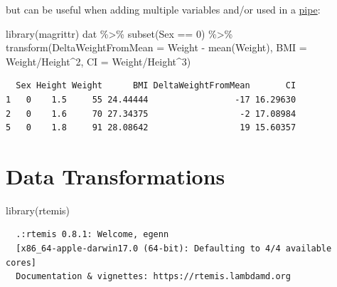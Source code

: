 \documentclass[
]{book}
\newenvironment{Shaded}{\begin{snugshade}}{\end{snugshade}}
\newcommand{\AttributeTok}[1]{\textcolor[rgb]{0.77,0.63,0.00}{#1}}
\newcommand{\DecValTok}[1]{\textcolor[rgb]{0.00,0.00,0.81}{#1}}
\newcommand{\FunctionTok}[1]{\textcolor[rgb]{0.00,0.00,0.00}{#1}}
\newcommand{\NormalTok}[1]{#1}
\newcommand{\OtherTok}[1]{\textcolor[rgb]{0.56,0.35,0.01}{#1}}
\newcommand{\SpecialCharTok}[1]{\textcolor[rgb]{0.00,0.00,0.00}{#1}}
\begin{document}
\begin{Shaded}
\end{Shaded}

but can be useful when adding multiple variables and/or used in a \protect\hyperlink{pipe}{pipe}:

\begin{Shaded}
\begin{Highlighting}[]
\FunctionTok{library}\NormalTok{(magrittr)}
\NormalTok{dat }\SpecialCharTok{\%\textgreater{}\%} 
  \FunctionTok{subset}\NormalTok{(Sex }\SpecialCharTok{==} \DecValTok{0}\NormalTok{) }\SpecialCharTok{\%\textgreater{}\%}
  \FunctionTok{transform}\NormalTok{(}\AttributeTok{DeltaWeightFromMean =}\NormalTok{ Weight }\SpecialCharTok{{-}} \FunctionTok{mean}\NormalTok{(Weight),}
            \AttributeTok{BMI =}\NormalTok{ Weight}\SpecialCharTok{/}\NormalTok{Height}\SpecialCharTok{\^{}}\DecValTok{2}\NormalTok{,}
            \AttributeTok{CI =}\NormalTok{ Weight}\SpecialCharTok{/}\NormalTok{Height}\SpecialCharTok{\^{}}\DecValTok{3}\NormalTok{)}
\end{Highlighting}
\end{Shaded}

\begin{verbatim}
  Sex Height Weight      BMI DeltaWeightFromMean       CI
1   0    1.5     55 24.44444                 -17 16.29630
2   0    1.6     70 27.34375                  -2 17.08984
5   0    1.8     91 28.08642                  19 15.60357
\end{verbatim}

\hypertarget{datatrans}{%
\chapter{Data Transformations}\label{datatrans}}

\begin{Shaded}
\begin{Highlighting}[]
\FunctionTok{library}\NormalTok{(rtemis)}
\end{Highlighting}
\end{Shaded}

\begin{verbatim}
  .:rtemis 0.8.1: Welcome, egenn
  [x86_64-apple-darwin17.0 (64-bit): Defaulting to 4/4 available cores]
  Documentation & vignettes: https://rtemis.lambdamd.org
\end{verbatim}
\end{document}
